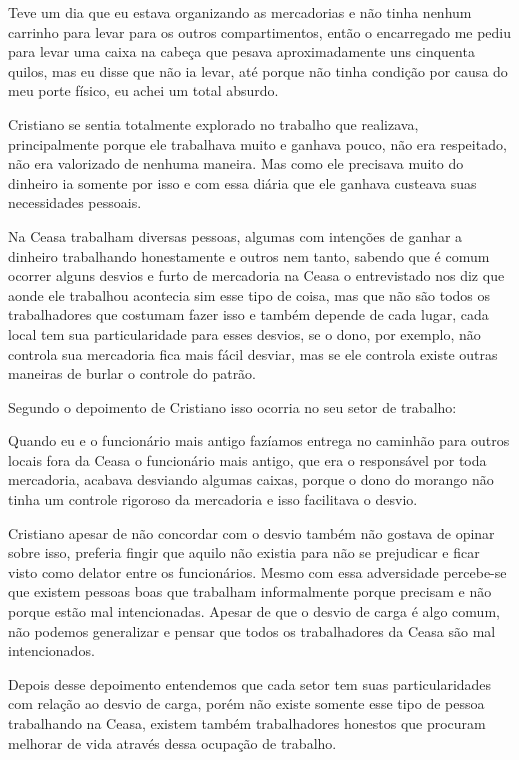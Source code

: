 \begin{citacao}
Teve um dia que eu estava organizando as mercadorias e não tinha nenhum carrinho para levar para os outros compartimentos, então o encarregado me pediu para levar uma caixa na cabeça que pesava aproximadamente uns cinquenta quilos, mas eu disse que não ia levar, até porque não tinha condição por causa do meu porte físico, eu achei um total absurdo.
\end{citacao}

Cristiano se sentia totalmente explorado no trabalho que realizava, principalmente porque ele trabalhava muito e ganhava pouco, não era respeitado, não era valorizado de nenhuma maneira. Mas como ele precisava muito do dinheiro ia somente por isso e com essa diária que ele ganhava custeava suas necessidades pessoais.

Na Ceasa trabalham diversas pessoas, algumas com intenções de ganhar a dinheiro trabalhando honestamente e outros nem tanto, sabendo que é comum ocorrer alguns desvios e furto de mercadoria na Ceasa o entrevistado nos diz que aonde ele trabalhou acontecia sim esse tipo de coisa, mas que não são todos os trabalhadores que costumam fazer isso e também depende de cada lugar, cada local tem sua particularidade para esses desvios, se o dono, por exemplo, não controla sua mercadoria fica mais fácil desviar, mas se ele controla existe outras maneiras de burlar o controle do patrão.

Segundo o depoimento de Cristiano isso ocorria no seu setor de trabalho:

\begin{citacao}
Quando eu e o funcionário mais antigo fazíamos entrega no caminhão para outros locais fora da Ceasa o funcionário mais antigo, que era o responsável por toda mercadoria, acabava desviando algumas caixas, porque o dono do morango não tinha um controle rigoroso da mercadoria e isso facilitava o desvio.
\end{citacao}

Cristiano apesar de não concordar com o desvio também não gostava de opinar sobre isso, preferia fingir que aquilo não existia para não se prejudicar e ficar visto como delator entre os funcionários. Mesmo com essa adversidade percebe-se que existem pessoas boas que trabalham informalmente porque precisam e não porque estão mal intencionadas. Apesar de que o desvio de carga é algo comum, não podemos generalizar e pensar que todos os trabalhadores da Ceasa são mal intencionados.

Depois desse depoimento entendemos que cada setor tem suas particularidades com relação ao desvio de carga, porém não existe somente esse tipo de pessoa trabalhando na Ceasa, existem também trabalhadores honestos que procuram melhorar de vida através dessa ocupação de trabalho.

